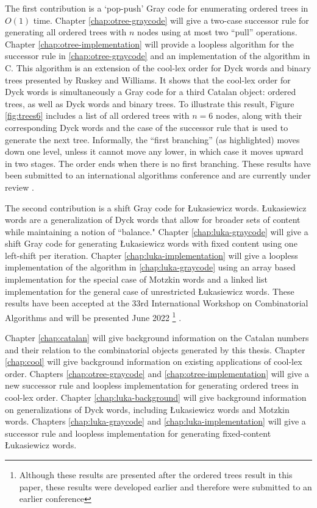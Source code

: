 The first contribution is a `pop-push' Gray code for enumerating ordered trees in $O(1)$ time. Chapter \ref{chap:otree-graycode} will give a two-case successor rule for generating all ordered trees with $n$ nodes using at most two ``pull'' operations. Chapter \ref{chap:otree-implementation} will provide a loopless algorithm for the successor rule in \ref{chap:otree-graycode} and an implementation of the algorithm in C.  This algorithm is an extension of the cool-lex order for Dyck words and binary trees presented by Ruskey and Williams. It shows that the cool-lex order for Dyck words is simultaneously a Gray code for a third Catalan object: ordered trees, as well as Dyck words and binary trees.  To illustrate this result, Figure \ref{fig:trees6} includes a list of all ordered trees with $n=6$ nodes, along with their corresponding Dyck words and the case of the successor rule that is used to generate the next tree.  Informally, the ``first branching'' (as highlighted) moves down one level, unless it cannot move any lower, in which case it moves upward in two stages.  The order ends when there is no first branching.  These results have been submitted to an international algorithms conference and are currently under review \cite{lapeypush}.

The second contribution is a shift Gray code for Łukasiewicz words.  Łukasiewicz words are a generalization of Dyck words that allow for broader sets of content while maintaining a notion of ``balance." Chapter \ref{chap:luka-graycode} will give a shift Gray code for generating Łukasiewicz words with fixed content using one left-shift per iteration.  Chapter \ref{chap:luka-implementation} will give a loopless implementation of the algorithm in \ref{chap:luka-graycode} using an array based implementation for the special case of Motzkin words and a linked list implementation for the general case of unrestricted Łukasiewicz words.  These results have been accepted at the 33rd International Workshop on Combinatorial Algorithms and will be presented June 2022 \footnote{Although these results are presented after the ordered trees result in this paper, these results were developed earlier and therefore were submitted to an earlier conference} \cite{lapey2022shift}.

Chapter \ref{chap:catalan} will give background information on the Catalan numbers and their relation to the combinatorial objects generated by this thesis.  Chapter \ref{chap:cool} will give background information on existing applications of cool-lex order.  Chapters \ref{chap:otree-graycode} and \ref{chap:otree-implementation} will give a new successor rule and loopless implementation for generating ordered trees in cool-lex order.  Chapter \ref{chap:luka-background} will give background information on generalizations of Dyck words, including Łukasiewicz words and Motzkin words. Chapters \ref{chap:luka-graycode} and \ref{chap:luka-implementation} will give a successor rule and loopless implementation for generating fixed-content Łukasiewicz words.


